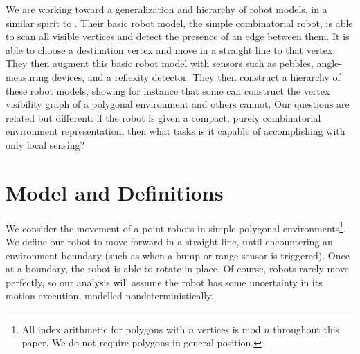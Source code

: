 \documentclass[]{styles/svproc}  %
\begin{document}
We are working toward a generalization and hierarchy of robot models, in a
similar spirit to \cite{brunner2008simple}. Their basic robot model, the simple
combinatorial robot, is able to scan all visible vertices and detect the
presence of an edge between them. It is able to choose a destination vertex and
move in a straight line to that vertex. They then augment this basic robot model
with sensors such as pebbles, angle-measuring devices, and a reflexity detector.
They then construct a hierarchy of these robot models, showing for instance that
some can construct the vertex visibility graph of a polygonal environment
and others cannot. Our questions are related but different: if the robot is
given a compact, purely combinatorial environment representation, then what tasks is 
it capable of accomplishing with only local sensing?

\section{Model and Definitions}

We consider the movement of a point robots in simple 
polygonal environments\footnote{All index arithmetic for polygons with $n$ vertices is mod $n$ 
throughout this paper. We do not require polygons in general position.}. We define our robot to move forward in a straight line, until
encountering an environment boundary (such as when a bump or range sensor is
triggered). Once at a boundary, the robot is able to rotate in place.
Of course, robots rarely move perfectly, so our analysis will assume the
robot has some uncertainty in its motion execution, modelled
nondeterministically.
\end{document}
